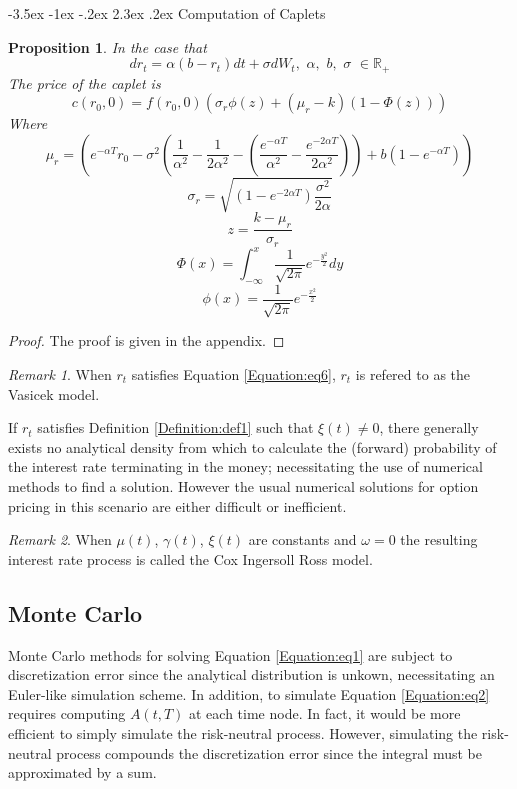 \documentclass[12pt]{article}
\makeatletter
\renewcommand\section{\@startsection{section}{1}{\z@}%
                                  {-3.5ex \@plus -1ex \@minus -.2ex}%
                                  {2.3ex \@plus.2ex}%
                                  {\normalfont\large\bfseries}}
\newtheorem{bond}{Proposition}
\theoremstyle{definition}
\theoremstyle{remark}
\newtheorem{rem}{Remark}
\makeatother
\begin{document}
\section{Computation of Caplets}
\begin{bond}
In the case that 
\begin{equation} dr_t=\alpha(b-r_t)dt+\sigma dW_t, \,\,\alpha,\,\, b,\,\, \sigma\,\,\in \mathbb{R}_{+} \label{Equation:eq6} \end{equation}
The price of the caplet is
\[c(r_0, 0)=f(r_0, 0)\left( \sigma_r \phi(z)+  (\mu_r-k)(1-\Phi(z))  \right)\] 
Where
\[\mu _r = \left(e^{-\alpha T} r_0-\sigma^2\left(\frac{1}{\alpha^2}-\frac{1}{2\alpha^2}-\left(\frac{e^{-\alpha T}}{\alpha^2}-\frac{e^{-2\alpha T}}{2\alpha^2} \right)\right)+ b \left(1-e^{-\alpha T} \right) \right)\]
\[\sigma_r= \sqrt{\left(1 -e^{-2\alpha T}\right)\frac{\sigma^2}{2\alpha}}\]
\[z=\frac{k-\mu_r}{\sigma_r}\]
\[\Phi(x)=\int_{-\infty} ^ x \frac{1}{\sqrt{2\pi}}e^{-\frac{y^2}{2}} dy \]
\[\phi(x)=\frac{1}{\sqrt{2\pi}}e^{-\frac{x^2}{2}} \]
\label{Proposition: prop5}
\end{bond}
\begin{proof}
The proof is given in the appendix.
\end{proof}
\begin{rem} When \(r_t\) satisfies Equation \ref{Equation:eq6}, \(r_t\) is refered to as the Vasicek model.\end{rem}
If \(r_t\) satisfies Definition \ref{Definition:def1} such that \(\xi (t) \neq 0\), there generally exists no analytical density from which to calculate the (forward) probability of the interest rate terminating in the money; necessitating the use of numerical methods to find a solution.  However the usual numerical solutions for option pricing in this scenario are either difficult or inefficient.  
\begin{rem} When \(\mu(t)\), \(\gamma(t)\), \(\xi(t)\) are constants and \(\omega=0\) the resulting interest rate process is called the Cox Ingersoll Ross model.   \end{rem}
\subsection{Monte Carlo}
Monte Carlo methods for solving Equation \ref{Equation:eq1} are subject to discretization error since the analytical distribution is unkown, necessitating an Euler-like simulation scheme. In addition, to simulate Equation \ref{Equation:eq2} requires computing \(A(t, T)\) at each time node.  In fact, it would be more efficient to simply simulate the risk-neutral process.  However, simulating the risk-neutral process compounds the discretization error since the integral must be approximated by a sum.  
\end{document}
